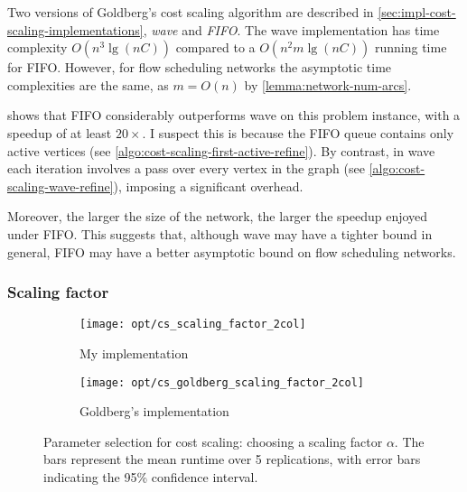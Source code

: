 Two versions of Goldberg's cost scaling algorithm are described in \cref{sec:impl-cost-scaling-implementations}, \emph{wave} and \emph{FIFO}. The wave implementation has time complexity $O\left(n^3 \lg \left(nC\right)\right)$ compared to a $O\left(n^2m\lg\left(nC\right)\right)$ running time for FIFO. However, for flow scheduling networks the asymptotic time complexities are the same, as $m = O(n)$ by \cref{lemma:network-num-arcs}. 

 shows that FIFO considerably outperforms wave on this problem instance, with a speedup of at least $20\times$. I suspect this is because the FIFO queue contains only active vertices (see \cref{algo:cost-scaling-first-active-refine}). By contrast, in wave each iteration involves a pass over every vertex in the graph (see \cref{algo:cost-scaling-wave-refine}), imposing a significant overhead.

Moreover, the larger the size of the network, the larger the speedup enjoyed under FIFO. This suggests that, although wave may have a tighter bound in general, FIFO may have a better asymptotic bound on flow scheduling networks.


\subsubsection{Scaling factor} \label{sec:eval-optimisations-cs-scaling-factor}

\begin{figure}
    \begin{widepage}
    \begin{subfigure}[c]{0.5\textwidth}
        \texttt{[image: opt/cs\_scaling\_factor\_2col]}
        \caption{My implementation}
    \end{subfigure}
    \begin{subfigure}[c]{0.5\textwidth}
        \texttt{[image: opt/cs\_goldberg\_scaling\_factor\_2col]}
        \caption{Goldberg's implementation}
    \end{subfigure}
    \end{widepage}
    \caption[Parameter selection for cost scaling]{Parameter selection for cost scaling: choosing a scaling factor $\alpha$. The bars represent the mean runtime over 5 replications, with error bars indicating the 95\% confidence interval.}
    \label{fig:opt-cs-scaling-factor}
\end{figure}

